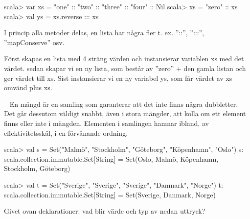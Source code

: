 {{\begin{REPL}
scala> var xs = "one" :: "two" :: "three" :: "four" :: Nil
scala> xs = "zero" :: xs
scala> val ys = xs.reverse ::: xs
\end{REPL}


\SOLUTION


\TaskSolved \what


\SubtaskSolved
I princip alla metoder delas, en lista har några fler t. ex. ''::'', '':::'', ''mapConserve'' osv.

\SubtaskSolved
Först skapas en lista med 4 sträng värden och instansierar variablen xs med det värdet.
sedan skapar vi en ny lista, som består av ''zero'' + den gamla listan och ger värdet till xs.
Sist instansierar vi en ny variabel ys, som får värdet av xs omvänd plus xs.


\QUESTEND









\QUESTBEGIN

\Task  \what~  En mängd är en samling som garanterar att det inte finns några dubbletter. Det går dessutom väldigt snabbt, även i stora mängder, att kolla om ett element finns eller inte i mängden. Elementen i samlingen  hamnar ibland, av effektivitetsskäl, i en förvånande ordning.
\begin{REPL}
scala> val s = Set("Malmö", "Stockholm", "Göteborg", "Köpenhamn", "Oslo")
s: scala.collection.immutable.Set[String] =
     Set(Oslo, Malmö, Köpenhamn, Stockholm, Göteborg)

scala> val t = Set("Sverige", "Sverige", "Sverige", "Danmark", "Norge")
t: scala.collection.immutable.Set[String] = Set(Sverige, Danmark, Norge)
\end{REPL}
Givet ovan deklarationer: vad blir värde och typ av nedan uttryck?

\Subtask {}

\Subtask {}

\Subtask {}

\Subtask {}

\Subtask {}

\Subtask {}

\Subtask {}

\Subtask {}

}}
